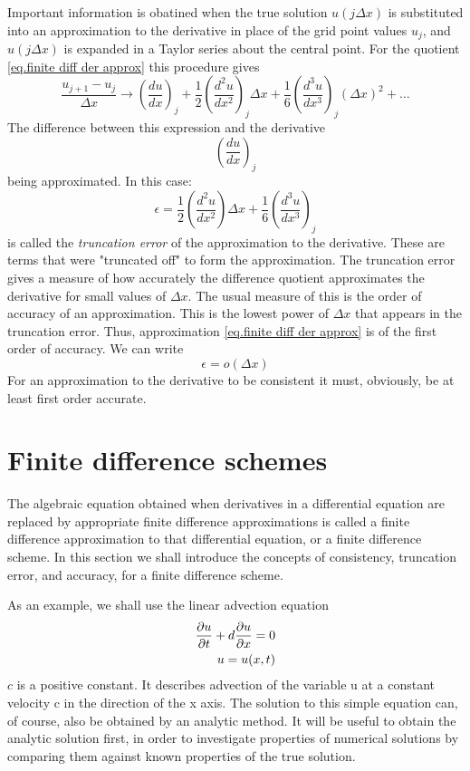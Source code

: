 Important information is obatined when the true solution $u(j\Delta x)$ is substituted into an approximation to the derivative in place of the grid point values $u_j$, and$ u(j\Delta x)$ is expanded in a Taylor series about the central point. For the quotient \ref{eq.finite diff der approx} this procedure gives
\begin{equation}
	\frac{u_{j+1}-u_j}{\Delta x}\rightarrow\left(\frac{du}{dx}\right)_j+\frac{1}{2}\left(\frac{d^2u}{dx^2}\right)_j\Delta x+\frac{1}{6}\left(\frac{d^3u}{dx^3}\right)_j(\Delta x)^2+\dots
\end{equation}
The difference between this expression and the derivative $$\left(\frac{du}{dx}\right)_j$$ being approximated. In this case:
\begin{equation}
	\epsilon= \frac{1}{2}\left(\frac{d^2u}{dx^2}\right)\Delta x+\frac{1}{6}\left(\frac{d^3u}{dx^3}\right)_j
\end{equation}
is called the \textit{truncation error} of the approximation to the derivative. These are terms that were "truncated off" to form the approximation. The truncation error gives a measure of how accurately the difference quotient approximates the derivative for small values of $\Delta x$. The usual measure of this is the order of accuracy of an approximation. This is the lowest power of $\Delta x$ that appears in the truncation error. Thus, approximation \ref{eq.finite diff der approx}
is of the first order of accuracy. We can write
\begin{equation}
	\epsilon =o(\Delta x)
\end{equation}
For an approximation to the derivative to be consistent it must, obviously, be at least first order accurate.
\section{Finite difference schemes}
The algebraic equation obtained when derivatives in a differential equation are replaced by appropriate finite difference approximations is called a finite difference approximation to that differential equation, or a finite difference scheme. In this section we shall introduce the concepts of consistency, truncation error, and accuracy, for a finite difference scheme.

As an example, we shall use the linear advection equation
\begin{align}\label{eq:linear adv eq}
	\frac{\partial u}{\partial t}+d\frac{\partial u}{\partial x}=0 \notag \\
	u=u(x,t)
\end{align}
$c$ is a positive constant.
It describes advection of the variable u at a constant velocity c in the direction of the x axis. The solution to this simple equation can, of course, also be obtained by an analytic method. It will be useful to obtain the analytic solution first, in order to investigate properties of numerical solutions by comparing them against known properties of the true solution.

